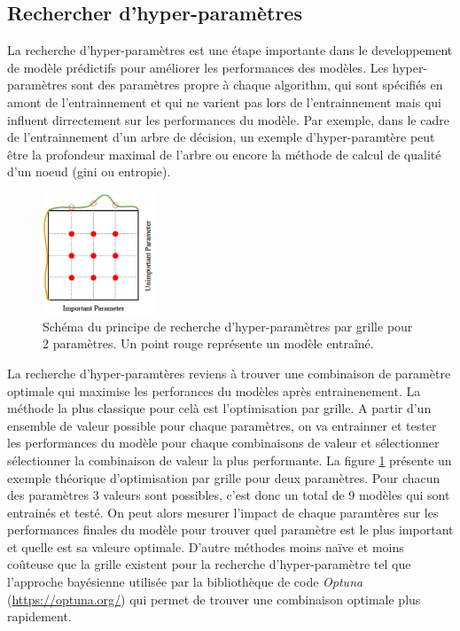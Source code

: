 \subsection{Rechercher d'hyper-paramètres}
La recherche d'hyper-paramètres est une étape importante dans le developpement de modèle prédictifs pour améliorer les performances des modèles. Les hyper-paramètres sont des paramètres propre à chaque algorithm, qui sont spécifiés en amont de l'entrainnement et qui ne varient pas lors de l'entrainnement mais qui influent dirrectement sur les performances du modèle. Par exemple, dans le cadre de l'entrainnement d'un arbre de décision, un exemple d'hyper-paramtère peut être la profondeur maximal de l'arbre ou encore la méthode de calcul de qualité d'un noeud (gini ou entropie).
\begin{figure}[!htbp]
 \centering
 \includegraphics[width=0.3\textwidth]{figures/parameters_grid.png}
 \caption[Schéma rechercher hyper-paramètres]{Schéma du principe de recherche d'hyper-paramètres par grille pour 2 paramètres. Un point rouge représente un modèle entraîné. }
 \label{fig:params_grid}
\end{figure}
La recherche d'hyper-paramtères reviens à trouver une combinaison de paramètre optimale qui maximise les perforances du modèles après entrainenement. La méthode la plus classique pour celà est l'optimisation par grille. A partir d'un ensemble de valeur possible pour chaque paramètres, on va entrainner et tester les performances du modèle pour chaque combinaisons de valeur et sélectionner sélectionner la combinaison de valeur la plus performante. La figure \ref{fig:params_grid}  présente un exemple théorique d'optimisation par grille pour deux paramètres. Pour chacun des paramètres 3 valeurs sont possibles, c'est donc un total de 9 modèles qui sont entrainés et testé. On peut alors mesurer l'impact de chaque paramtères sur les performances finales du modèle pour trouver quel paramètre est le plus important et quelle est sa valeure optimale.
D'autre méthodes moins naïve et moins coûteuse que la grille existent pour la recherche d'hyper-paramètre tel que l'approche bayésienne utilisée par la bibliothèque de code \textit{Optuna} (\href{https://optuna.org/}{https://optuna.org/}) qui permet de trouver une combinaison optimale plus rapidement.

